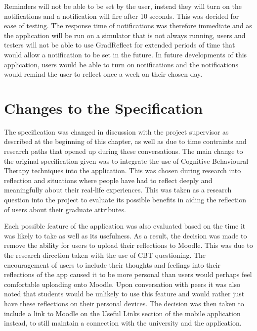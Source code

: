 \documentclass{l4proj}
\begin{document}
Reminders will not be able to be set by the user, instead they will turn on the notifications and a notification will fire after 10 seconds. This was decided for ease of testing. The response time of notifications was therefore immediate and as the application will be run on a simulator that is not always running, users and testers will not be able to use GradReflect for extended periods of time that would allow a notification to be set in the future. In future developments of this application, users would be able to turn on notifications and the notifications would remind the user to reflect once a week on their chosen day. 

\section{Changes to the Specification}

The specification was changed in discussion with the project supervisor as described at the beginning of this chapter, as well as due to time contraints and research paths that opened up during these conversations. The main change to the original specification given was to integrate the use of Cognitive Behavioural Therapy techniques into the application. This was chosen during research into reflection and situations where people have had to reflect deeply and meaningfully about their real-life experiences. This was taken as a research question into the project to evaluate its possible benefits in aiding the reflection of users about their graduate attributes. 

Each possible feature of the application was also evaluated based on the time it was likely to take as well as its usefulness. As a result, the decision was made to remove the ability for users to upload their reflections to Moodle. This was due to the research direction taken with the use of CBT questioning. The encouragement of users to include their thoughts and feelings into their reflections of the app caused it to be more personal than users would perhaps feel 
comfortable uploading onto Moodle. Upon conversation with peers it was also noted that students would be unlikely to use this feature and would rather just have these reflections on their personal devices. The decision was then taken to include a link to Moodle on the Useful Links section of the mobile application instead, to still maintain a connection with the university and the application. 


\end{document}
